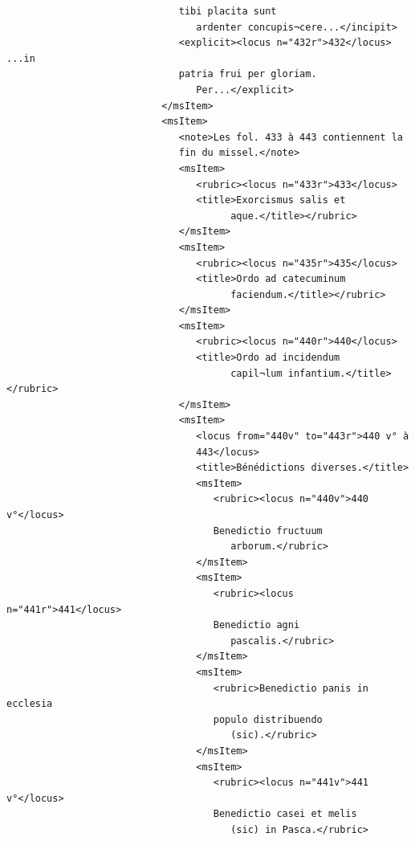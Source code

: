 \documentclass[a4paper,12pt,twoside]{book}
\begin{document}
\begin{verbatim}
                              tibi placita sunt
                                 ardenter concupis¬cere...</incipit>
                              <explicit><locus n="432r">432</locus> ...in 
                              patria frui per gloriam.
                                 Per...</explicit>
                           </msItem>
                           <msItem>
                              <note>Les fol. 433 à 443 contiennent la 
                              fin du missel.</note>
                              <msItem>
                                 <rubric><locus n="433r">433</locus>
                                 <title>Exorcismus salis et
                                       aque.</title></rubric>
                              </msItem>
                              <msItem>
                                 <rubric><locus n="435r">435</locus>
                                 <title>Ordo ad catecuminum
                                       faciendum.</title></rubric>
                              </msItem>
                              <msItem>
                                 <rubric><locus n="440r">440</locus>
                                 <title>Ordo ad incidendum
                                       capil¬lum infantium.</title></rubric>
                              </msItem>
                              <msItem>
                                 <locus from="440v" to="443r">440 v° à
                                 443</locus>
                                 <title>Bénédictions diverses.</title>
                                 <msItem>
                                    <rubric><locus n="440v">440 v°</locus>
                                    Benedictio fructuum
                                       arborum.</rubric>
                                 </msItem>
                                 <msItem>
                                    <rubric><locus n="441r">441</locus> 
                                    Benedictio agni
                                       pascalis.</rubric>
                                 </msItem>
                                 <msItem>
                                    <rubric>Benedictio panis in ecclesia 
                                    populo distribuendo
                                       (sic).</rubric>
                                 </msItem>
                                 <msItem>
                                    <rubric><locus n="441v">441 v°</locus>
                                    Benedictio casei et melis
                                       (sic) in Pasca.</rubric>

\end{verbatim}
\end{document}
